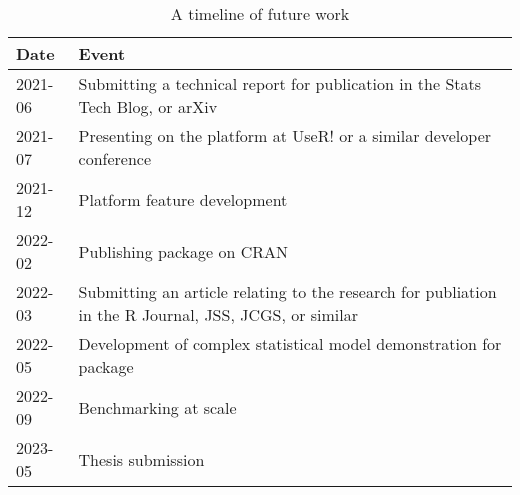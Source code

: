 \begin{table}[h]
        \centering
        \begin{tabularx}{\textwidth}{lX}
                \toprule
                Date & Event\\
                \midrule
                2021-06 & Submitting a technical report for publication in the Stats Tech Blog, or arXiv\\
                2021-07 & Presenting on the platform at UseR! or a similar developer conference\\
                2021-12 & Platform feature development\\
                2022-02 & Publishing package on CRAN\\
                2022-03 & Submitting an article relating to the research for publiation in the R Journal, JSS, JCGS, or similar\\
                2022-05 & Development of complex statistical model demonstration for package\\
                2022-09 & Benchmarking at scale\\
                2023-05 & Thesis submission\\
                \bottomrule
        \end{tabularx}
        \caption{\label{future-timeline}A timeline of future work}
\end{table}
